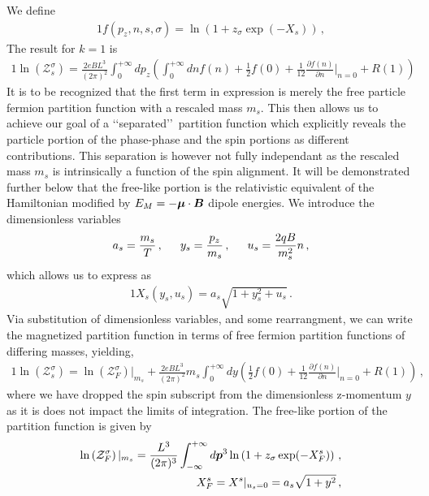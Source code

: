 We define
\begin{alignat}{1}
    \label{Func} f(p_{z},n,s,\sigma)=\ln\left(1+z_{\sigma}\exp(-X_{s})\right)\,,
\end{alignat}
The result for $k=1$ is
\begin{alignat}{1}
    \label{PartFuncTwo} \ln\left(\mathcal{Z}_{s}^{\sigma}\right)=\frac{2eBL^{3}}{(2\pi)^{2}}\int_{0}^{+\infty}dp_{z}\left(\int_{0}^{+\infty}dn f(n) + \frac{1}{2}f(0) + \frac{1}{12}\frac{\partial f(n)}{\partial n}\bigg\rvert_{n=0} + R(1)\right)
\end{alignat}
It is to be recognized that the first term in expression  is merely the free particle fermion partition function with a rescaled mass $m_{s}$. This then allows us to achieve our goal of a \lq\lq separated\rq\rq\ partition function which explicitly reveals the particle portion of the phase-phase and the spin portions as different contributions. This separation is however not fully independant as the rescaled mass $m_{s}$ is intrinsically a function of the spin alignment. It will be demonstrated further below that the free-like portion is the relativistic equivalent of the Hamiltonian modified by $E_{M}=-\boldsymbol{\mu}\cdot\boldsymbol{B}$ dipole energies. We introduce the dimensionless variables
\begin{alignat}{1}
    \label{Unitless} a_{s}=\frac{m_{s}}{T}\,,\indent y_{s}=\frac{p_{z}}{m_{s}}\,,\indent u_{s}=\frac{2qB}{m_{s}^{2}}n\,,
\end{alignat}
which allows us to express  as
\begin{alignat}{1}
    \label{UnitlessBoltz} X_{s}(y_{s},u_{s})=a_{s}\sqrt{1+y_{s}^{2}+u_{s}}\,.
\end{alignat}
Via substitution of dimensionless variables, and some rearrangment, we can write the magnetized partition function in terms of free fermion partition functions of differing masses, yielding,
\begin{alignat}{1}
    \label{Equality} \ln\left(\mathcal{Z}^{\sigma}_{s}\right) = \ln\left(\mathcal{Z}^{\sigma}_{F}\right)|_{m_{s}} + \frac{2eBL^{3}}{(2\pi)^{2}}m_{s}\int_{0}^{+\infty}dy\left(\frac{1}{2}f(0) + \frac{1}{12}\frac{\partial f(n)}{\partial n}\bigg\rvert_{n=0} + R(1)\right)\,,
\end{alignat}
where we have dropped the spin subscript from the dimensionless z-momentum $y$ as it is does not impact the limits of integration. The free-like portion of the partition function is given by
\begin{align}
    \label{Freelike} \ln\left(\mathcal{Z}^{\sigma}_{F}\right)|_{m_{s}}=\frac{L^{3}}{(2\pi)^{3}}\int^{+\infty}_{-\infty}d\boldsymbol{p}^{3}\ln\left(1+z_{\sigma}\exp(-X^{s}_{F})\right)\,,\\
    X^{s}_{F} = X^{s}\vert_{u_{s}=0} = a_{s}\sqrt{1+y^{2}}\,,
\end{align}
